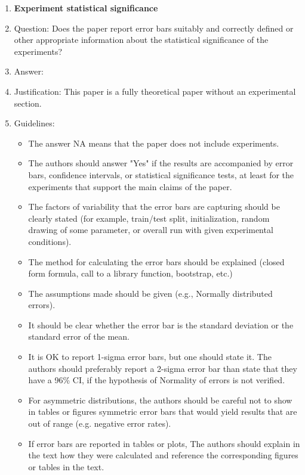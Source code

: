 \documentclass{article}
\theoremstyle{plain}
\theoremstyle{definition}
\theoremstyle{remark}
\begin{document}
\begin{enumerate}
\item {\bf Experiment statistical significance}
    \item[] Question: Does the paper report error bars suitably and correctly defined or other appropriate information about the statistical significance of the experiments?
    \item[] Answer: \answerNA{} %
    \item[] Justification: This paper is a fully theoretical paper without an experimental section.
    \item[] Guidelines:
    \begin{itemize}
        \item The answer NA means that the paper does not include experiments.
        \item The authors should answer "Yes" if the results are accompanied by error bars, confidence intervals, or statistical significance tests, at least for the experiments that support the main claims of the paper.
        \item The factors of variability that the error bars are capturing should be clearly stated (for example, train/test split, initialization, random drawing of some parameter, or overall run with given experimental conditions).
        \item The method for calculating the error bars should be explained (closed form formula, call to a library function, bootstrap, etc.)
        \item The assumptions made should be given (e.g., Normally distributed errors).
        \item It should be clear whether the error bar is the standard deviation or the standard error of the mean.
        \item It is OK to report 1-sigma error bars, but one should state it. The authors should preferably report a 2-sigma error bar than state that they have a 96\% CI, if the hypothesis of Normality of errors is not verified.
        \item For asymmetric distributions, the authors should be careful not to show in tables or figures symmetric error bars that would yield results that are out of range (e.g. negative error rates).
        \item If error bars are reported in tables or plots, The authors should explain in the text how they were calculated and reference the corresponding figures or tables in the text.
    \end{itemize}


\end{enumerate}
\end{document}
